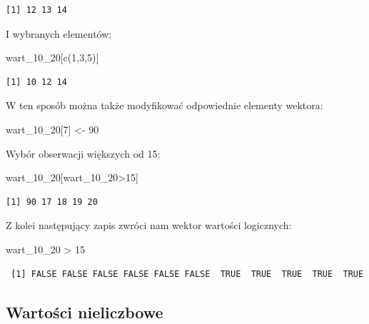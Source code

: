 \documentclass[
  letterpaper,
  DIV=11,
  numbers=noendperiod]{scrreprt}
\newenvironment{Shaded}{\begin{snugshade}}{\end{snugshade}}
\newcommand{\DecValTok}[1]{\textcolor[rgb]{0.68,0.00,0.00}{#1}}
\newcommand{\FunctionTok}[1]{\textcolor[rgb]{0.28,0.35,0.67}{#1}}
\newcommand{\NormalTok}[1]{\textcolor[rgb]{0.00,0.23,0.31}{#1}}
\newcommand{\OtherTok}[1]{\textcolor[rgb]{0.00,0.23,0.31}{#1}}
\newcommand{\SpecialCharTok}[1]{\textcolor[rgb]{0.37,0.37,0.37}{#1}}
\begin{document}
\begin{verbatim}
[1] 12 13 14
\end{verbatim}

I wybranych elementów:

\begin{Shaded}
\begin{Highlighting}[]
\NormalTok{wart\_10\_20[}\FunctionTok{c}\NormalTok{(}\DecValTok{1}\NormalTok{,}\DecValTok{3}\NormalTok{,}\DecValTok{5}\NormalTok{)]}
\end{Highlighting}
\end{Shaded}

\begin{verbatim}
[1] 10 12 14
\end{verbatim}

W ten sposób można także modyfikować odpowiednie elementy wektora:

\begin{Shaded}
\begin{Highlighting}[]
\NormalTok{wart\_10\_20[}\DecValTok{7}\NormalTok{] }\OtherTok{\textless{}{-}} \DecValTok{90}
\end{Highlighting}
\end{Shaded}

Wybór obserwacji większych od 15:

\begin{Shaded}
\begin{Highlighting}[]
\NormalTok{wart\_10\_20[wart\_10\_20}\SpecialCharTok{\textgreater{}}\DecValTok{15}\NormalTok{]}
\end{Highlighting}
\end{Shaded}

\begin{verbatim}
[1] 90 17 18 19 20
\end{verbatim}

Z kolei następujący zapis zwróci nam wektor wartości logicznych:

\begin{Shaded}
\begin{Highlighting}[]
\NormalTok{wart\_10\_20 }\SpecialCharTok{\textgreater{}} \DecValTok{15}
\end{Highlighting}
\end{Shaded}

\begin{verbatim}
 [1] FALSE FALSE FALSE FALSE FALSE FALSE  TRUE  TRUE  TRUE  TRUE  TRUE
\end{verbatim}

\hypertarget{wartoux15bci-nieliczbowe}{%
\subsection{Wartości nieliczbowe}\label{wartoux15bci-nieliczbowe}}
\end{document}
